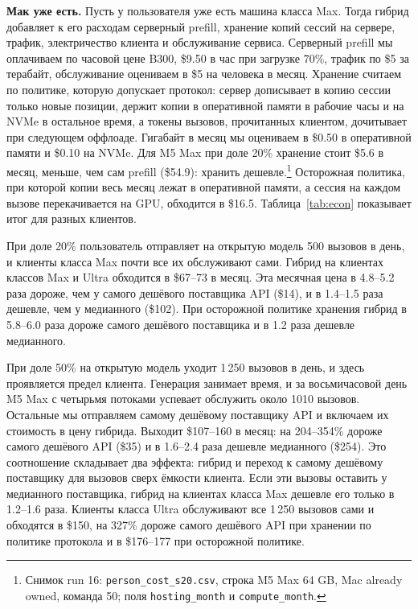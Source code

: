 \textbf{Мак уже есть.} Пусть у пользователя уже есть машина класса Max. Тогда гибрид добавляет к его расходам
серверный prefill, хранение копий сессий на сервере, трафик, электричество клиента и обслуживание сервиса. Серверный
prefill мы оплачиваем по часовой цене B300, \$9.50 в час при загрузке 70\%, трафик по \$5 за терабайт, обслуживание
оцениваем в \$5 на человека в месяц. Хранение считаем по политике, которую допускает протокол: сервер дописывает в
копию сессии только новые позиции, держит копии в оперативной памяти в рабочие часы и на NVMe в остальное время, а токены вызовов, прочитанных клиентом, дочитывает при следующем оффлоаде. Гигабайт в месяц мы оцениваем в \$0.50 в оперативной памяти и \$0.10 на NVMe. Для M5 Max при доле 20\% хранение стоит \$5.6 в месяц, меньше, чем сам prefill (\$54.9): хранить дешевле.\footnote{Снимок run 16: \texttt{person\_cost\_s20.csv}, строка M5 Max 64 GB, Mac already owned, команда 50; поля \texttt{hosting\_month} и \texttt{compute\_month}.} Осторожная политика, при которой копии весь месяц лежат в оперативной памяти, а сессия на каждом
вызове перекачивается на GPU, обходится в \$16.5. Таблица~\ref{tab:econ} показывает итог для разных клиентов.

При доле 20\% пользователь отправляет на открытую модель 500 вызовов в день, и клиенты класса Max почти все их
обслуживают сами. Гибрид на клиентах классов Max и Ultra обходится в \$67--73 в месяц. Эта месячная цена в 4.8--5.2 раза дороже, чем у самого дешёвого поставщика API
(\$14), и в 1.4--1.5 раза дешевле, чем у медианного (\$102). При осторожной политике
хранения гибрид в 5.8--6.0 раза дороже самого дешёвого поставщика и в 1.2 раза дешевле медианного.

При доле 50\% на открытую модель уходит 1\,250 вызовов в день, и здесь проявляется предел клиента. Генерация
занимает время, и за восьмичасовой день M5 Max с четырьмя потоками успевает обслужить около 1010 вызовов. Остальные мы
отправляем самому дешёвому поставщику API и включаем их стоимость в цену гибрида. Выходит \$107--160 в месяц: на 204--354\% дороже самого
дешёвого API (\$35) и в 1.6--2.4 раза дешевле медианного (\$254). Это соотношение складывает два
эффекта: гибрид и переход к самому дешёвому поставщику для вызовов сверх ёмкости клиента. Если эти вызовы оставить у
медианного поставщика, гибрид на клиентах класса Max дешевле его только в 1.2--1.6 раза. Клиенты класса Ultra обслуживают все 1\,250 вызовов
сами и обходятся в \$150, на 327\% дороже самого дешёвого API при хранении по политике протокола и в \$176--177 при осторожной политике.

